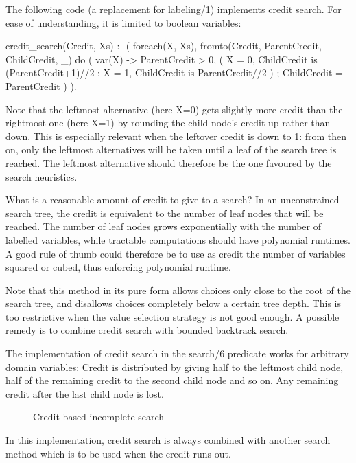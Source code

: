 The following code (a replacement for labeling/1)
implements credit search. For ease of understanding, it is
limited to boolean variables:
\begin{code}
credit_search(Credit, Xs) :-
        (
            foreach(X, Xs),
            fromto(Credit, ParentCredit, ChildCredit, _)
        do
            ( var(X) ->
                ParentCredit > 0,  %
                ( %
                    X = 0, ChildCredit is (ParentCredit+1)//2
                ;
                    X = 1, ChildCredit is ParentCredit//2
                )
            ;
                ChildCredit = ParentCredit
            )
        ).
\end{code}
Note that the leftmost alternative (here X=0)
gets slightly more credit than the rightmost one (here X=1)
by rounding the child node's credit up rather than down. 
This is especially relevant when the leftover credit is down to 1:
from then on, only the leftmost alternatives will be taken until a
leaf of the search tree is reached. The leftmost alternative should
therefore be the one favoured by the search heuristics.

What is a reasonable amount of credit to give to a search?
In an unconstrained search tree, the credit is equivalent to the
number of leaf nodes that will be reached.
The number of leaf nodes grows exponentially with the number of
labelled variables, while tractable computations should have
polynomial runtimes. A good rule of thumb could therefore be to
use as credit the number of variables squared or cubed, thus enforcing
polynomial runtime.

Note that this method in its pure form allows choices only close to the
root of the search tree, and disallows choices completely below a certain
tree depth. This is too restrictive when the value selection strategy
is not good enough. A possible remedy is to combine credit search with
bounded backtrack search.


The implementation of credit search in the search/6 predicate works for
arbitrary domain variables: Credit is distributed by giving half to the
leftmost child node, half of the remaining credit to the second child node
and so on. Any remaining credit after the last child node is lost.
\begin{figure}
\begin{center}
\end{center}
\caption{Credit-based incomplete search}
\label{figcredit}
\end{figure}
In this implementation, credit search is always combined with another
search method which is to be used when the credit runs out.

